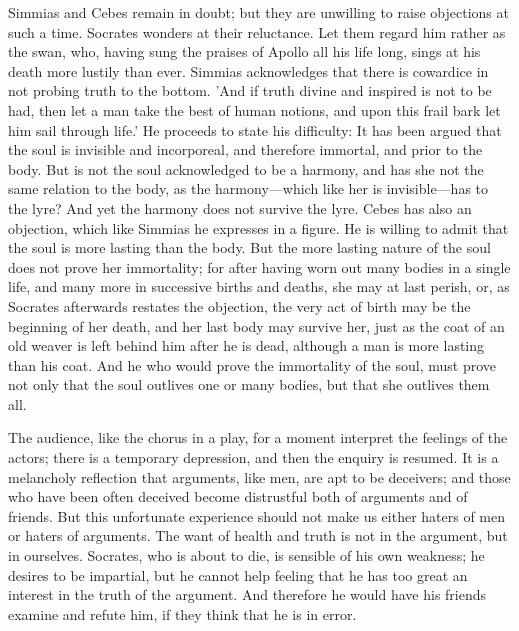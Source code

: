 \documentclass[11pt,letter]{article}
\begin{document}
\par  Simmias and Cebes remain in doubt; but they are unwilling to raise objections at such a time. Socrates wonders at their reluctance. Let them regard him rather as the swan, who, having sung the praises of Apollo all his life long, sings at his death more lustily than ever. Simmias acknowledges that there is cowardice in not probing truth to the bottom. 'And if truth divine and inspired is not to be had, then let a man take the best of human notions, and upon this frail bark let him sail through life.' He proceeds to state his difficulty: It has been argued that the soul is invisible and incorporeal, and therefore immortal, and prior to the body. But is not the soul acknowledged to be a harmony, and has she not the same relation to the body, as the harmony—which like her is invisible—has to the lyre? And yet the harmony does not survive the lyre. Cebes has also an objection, which like Simmias he expresses in a figure. He is willing to admit that the soul is more lasting than the body. But the more lasting nature of the soul does not prove her immortality; for after having worn out many bodies in a single life, and many more in successive births and deaths, she may at last perish, or, as Socrates afterwards restates the objection, the very act of birth may be the beginning of her death, and her last body may survive her, just as the coat of an old weaver is left behind him after he is dead, although a man is more lasting than his coat. And he who would prove the immortality of the soul, must prove not only that the soul outlives one or many bodies, but that she outlives them all.

\par  The audience, like the chorus in a play, for a moment interpret the feelings of the actors; there is a temporary depression, and then the enquiry is resumed. It is a melancholy reflection that arguments, like men, are apt to be deceivers; and those who have been often deceived become distrustful both of arguments and of friends. But this unfortunate experience should not make us either haters of men or haters of arguments. The want of health and truth is not in the argument, but in ourselves. Socrates, who is about to die, is sensible of his own weakness; he desires to be impartial, but he cannot help feeling that he has too great an interest in the truth of the argument. And therefore he would have his friends examine and refute him, if they think that he is in error.
\end{document}
